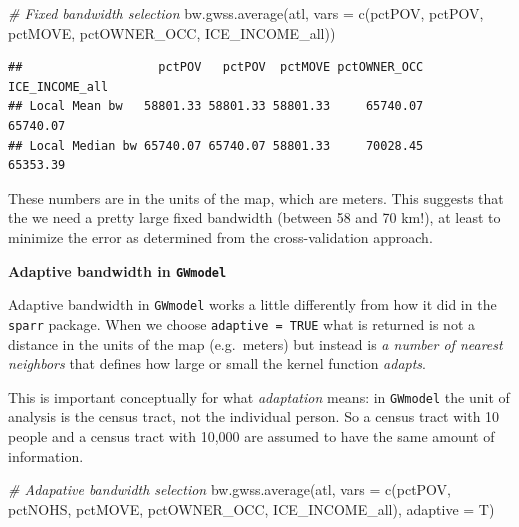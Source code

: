 \documentclass[
]{book}
\newenvironment{Shaded}{\begin{snugshade}}{\end{snugshade}}
\newcommand{\AttributeTok}[1]{\textcolor[rgb]{0.77,0.63,0.00}{#1}}
\newcommand{\CommentTok}[1]{\textcolor[rgb]{0.56,0.35,0.01}{\textit{#1}}}
\newcommand{\FunctionTok}[1]{\textcolor[rgb]{0.00,0.00,0.00}{#1}}
\newcommand{\NormalTok}[1]{#1}
\newcommand{\StringTok}[1]{\textcolor[rgb]{0.31,0.60,0.02}{#1}}
\newenvironment{rmdnote}[1]
  {
  \begin{itemize}
  \renewcommand{\labelitemi}{
    \raisebox{-.7\height}[0pt][0pt]{
      {\setkeys{Gin}{width=3em,keepaspectratio}\texttt{[image: images/\#1]}}
    }
  }
  \setlength{\fboxsep}{1em}
  \begin{note}
  \item
  }
  {
  \end{note}
  \end{itemize}
  }
\begin{document}
\begin{Shaded}
\begin{Highlighting}[]
\CommentTok{\# Fixed bandwidth selection}
\FunctionTok{bw.gwss.average}\NormalTok{(atl, }\AttributeTok{vars =} \FunctionTok{c}\NormalTok{(}\StringTok{\textquotesingle{}pctPOV\textquotesingle{}}\NormalTok{, }\StringTok{\textquotesingle{}pctPOV\textquotesingle{}}\NormalTok{, }\StringTok{\textquotesingle{}pctMOVE\textquotesingle{}}\NormalTok{, }
                              \StringTok{\textquotesingle{}pctOWNER\_OCC\textquotesingle{}}\NormalTok{, }\StringTok{\textquotesingle{}ICE\_INCOME\_all\textquotesingle{}}\NormalTok{))}
\end{Highlighting}
\end{Shaded}

\begin{verbatim}
##                   pctPOV   pctPOV  pctMOVE pctOWNER_OCC ICE_INCOME_all
## Local Mean bw   58801.33 58801.33 58801.33     65740.07       65740.07
## Local Median bw 65740.07 65740.07 58801.33     70028.45       65353.39
\end{verbatim}

These numbers are in the units of the map, which are meters. This suggests that the we need a pretty large fixed bandwidth (between 58 and 70 km!), at least to minimize the error as determined from the cross-validation approach.

\begin{rmdnote}{note}
\textbf{Adaptive bandwidth in \texttt{GWmodel}}

Adaptive bandwidth in \texttt{GWmodel} works a little differently from how it did in the \texttt{sparr} package. When we choose \texttt{adaptive\ =\ TRUE} what is returned is not a distance in the units of the map (e.g.~meters) but instead is \emph{a number of nearest neighbors} that defines how large or small the kernel function \emph{adapts}.

This is important conceptually for what \emph{adaptation} means: in \texttt{GWmodel} the unit of analysis is the census tract, not the individual person. So a census tract with 10 people and a census tract with 10,000 are assumed to have the same amount of information.

\end{rmdnote}

\begin{Shaded}
\begin{Highlighting}[]
\CommentTok{\# Adapative bandwidth selection}
\FunctionTok{bw.gwss.average}\NormalTok{(atl, }\AttributeTok{vars =} \FunctionTok{c}\NormalTok{(}\StringTok{\textquotesingle{}pctPOV\textquotesingle{}}\NormalTok{, }\StringTok{\textquotesingle{}pctNOHS\textquotesingle{}}\NormalTok{, }\StringTok{\textquotesingle{}pctMOVE\textquotesingle{}}\NormalTok{, }
                              \StringTok{\textquotesingle{}pctOWNER\_OCC\textquotesingle{}}\NormalTok{, }\StringTok{\textquotesingle{}ICE\_INCOME\_all\textquotesingle{}}\NormalTok{),}
                \AttributeTok{adaptive =}\NormalTok{ T)}
\end{Highlighting}
\end{Shaded}
\end{document}
